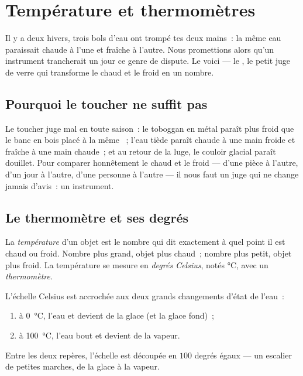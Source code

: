\chapter{Température et thermomètres}\label{ch:g3:temperature-thermometers}

Il y a deux hivers, trois bols d'eau ont trompé tes deux mains~: la
même eau paraissait chaude à l'une et fraîche à l'autre. Nous
promettions alors qu'un instrument trancherait un jour ce genre de
dispute. Le voici --- le , le petit juge de verre qui
transforme le chaud et le froid en un nombre.

\section{Pourquoi le toucher ne suffit pas}

\begin{example}\label{ex:g3:temperature-thermometers:unfair}
Le toucher juge mal en toute saison~: le toboggan en métal paraît
plus froid que le banc en bois placé à la même ~; l'eau tiède
paraît chaude à une main froide et fraîche à une main chaude~; et au
retour de la luge, le couloir glacial paraît douillet. Pour comparer
honnêtement le chaud et le froid --- d'une pièce à l'autre, d'un jour
à l'autre, d'une personne à l'autre --- il nous faut un juge qui ne
change jamais d'avis~: un instrument.
\end{example}

\section{Le thermomètre et ses degrés}

\begin{definition}[Température]\label{def:g3:temperature-thermometers:temperature}
La \emph{température} d'un objet est le nombre qui
dit exactement à quel point il est chaud ou froid. Nombre plus grand,
objet plus chaud~; nombre plus petit, objet plus froid. La
température se mesure en \emph{degrés Celsius},
notés \unit{\celsius}, avec un
\emph{thermomètre}.
\end{definition}

\begin{proposition}\label{prop:g3:temperature-thermometers:milestones}
L'échelle Celsius est accrochée aux deux grands changements d'état de
l'eau~:
\begin{enumerate}
  \item à \qty{0}{\celsius}, l'eau  et devient de la glace (et la
        glace fond)~;
  \item à \qty{100}{\celsius}, l'eau bout et devient de la vapeur.
\end{enumerate}
Entre les deux repères, l'échelle est découpée en $100$ degrés
égaux --- un escalier de petites marches, de la glace à la vapeur.
\end{proposition}

